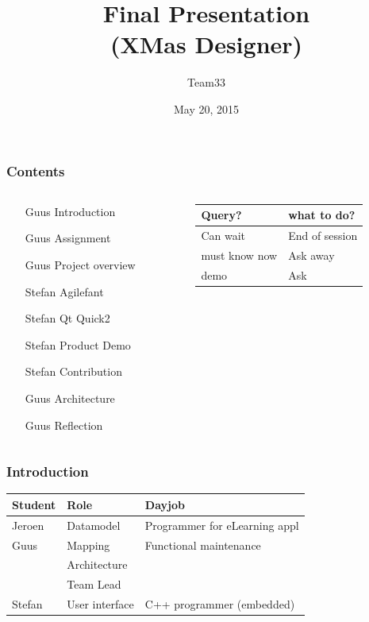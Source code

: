 \documentclass[11pt]{beamer}
\author{Team33}
\title{Final Presentation\\(XMas Designer)}
\institute{Open University/\\Guus Bonnema, Stefan Versluys, Jeroen Kleijn}
\date{May 20, 2015}
\begin{document}
\newcommand{\Noc}{\textsc{NoC}\xspace}
\newcommand{\qt}{\textsc{Qt}\xspace}
\newcommand{\qml}{\textsc{Qml}\xspace}
\newcommand{\ou}{\textsc{Ou}\xspace}
\newcommand{\dad}{\textsc{Dad}\xspace}
\newcommand{\cpp}{\textsc{C++}\xspace}

\begin{frame}
	\titlepage
\end{frame}

\begin{frame}
	\frametitle{Contents}
	\begin{columns}
		\begin{column}[t]{5cm}
			\begin{itemize}
				\item [Guus] Introduction 
				\item [Guus] Assignment
				\item [Guus] Project overview
				\item [Stefan] Agilefant
				\item [Stefan] Qt Quick2
				\item [Stefan] Product Demo
				\item [Stefan] Contribution
				\item [Guus] Architecture
				\item [Guus] Reflection
			\end{itemize}	
		\end{column}
		\begin{column}[t]{5cm}
			
			\begin{tabular}{ll}
				\hline
				{\tiny Query?} &  {\tiny what to do?} \\
				\hline
				{\tiny Can wait} & {\tiny End of session}\\
				{\tiny must know now} & {\tiny Ask away} \\
			 	{\tiny demo} & {\tiny Ask}\\
			 	\hline
			\end{tabular}
		\end{column}
	\end{columns}
	
\end{frame}

\begin{frame}
	\frametitle{Introduction}
	\begin{tabular}{lp{2.5cm}p{4cm}}
	\hline
	{\bf Student} & {\bf Role}      & {\bf Dayjob}\\\hline
	Jeroen        &  Datamodel      & Programmer for eLearning appl\\
	Guus	      &  Mapping        & Functional maintenance\\
	              &  Architecture   &                       \\
	              &  Team Lead     & \\
	Stefan        &  User interface & C++ programmer (embedded)\\
	\hline
	\end{tabular}
\end{frame}
\end{document}
